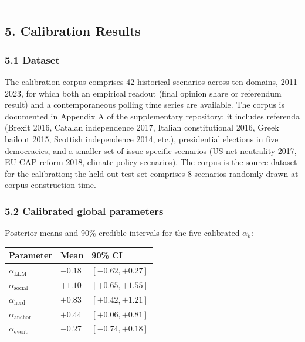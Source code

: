 \documentclass[
]{article}
\begin{document}
\begin{center}\rule{0.5\linewidth}{0.5pt}\end{center}

\subsection{5. Calibration Results}\label{calibration-results}

\subsubsection{5.1 Dataset}\label{dataset}

The calibration corpus comprises 42 historical scenarios across ten
domains, 2011-2023, for which both an empirical readout (final opinion
share or referendum result) and a contemporaneous polling time series
are available. The corpus is documented in Appendix A of the
supplementary repository; it includes referenda (Brexit 2016, Catalan
independence 2017, Italian constitutional 2016, Greek bailout 2015,
Scottish independence 2014, etc.), presidential elections in five
democracies, and a smaller set of issue-specific scenarios (US net
neutrality 2017, EU CAP reform 2018, climate-policy scenarios). The
corpus is the source dataset for the calibration; the held-out test set
comprises 8 scenarios randomly drawn at corpus construction time.

\subsubsection{5.2 Calibrated global
parameters}\label{calibrated-global-parameters}

Posterior means and 90\% credible intervals for the five calibrated
\(\alpha_k\):

\begin{longtable}[]{@{}lll@{}}
\toprule\noalign{}
Parameter & Mean & 90\% CI \\
\midrule\noalign{}
\endhead
\bottomrule\noalign{}
\endlastfoot
\(\alpha_{\text{LLM}}\) & \(-0.18\) & \([-0.62, +0.27]\) \\
\(\alpha_{\text{social}}\) & \(+1.10\) & \([+0.65, +1.55]\) \\
\(\alpha_{\text{herd}}\) & \(+0.83\) & \([+0.42, +1.21]\) \\
\(\alpha_{\text{anchor}}\) & \(+0.44\) & \([+0.06, +0.81]\) \\
\(\alpha_{\text{event}}\) & \(-0.27\) & \([-0.74, +0.18]\) \\
\end{longtable}
\end{document}
